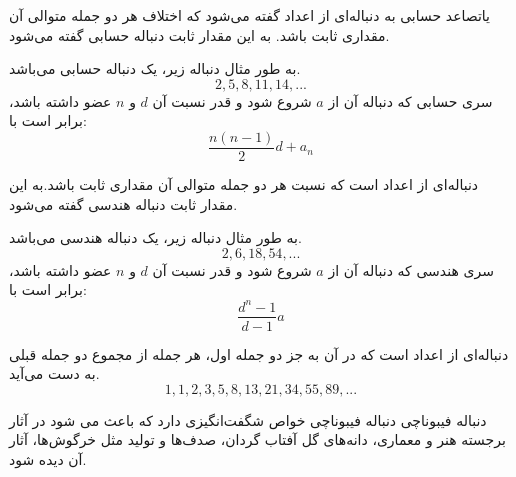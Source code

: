 \begin{definition}
    \p
    یاتصاعد حسابی به دنباله‌ای از اعداد گفته می‌شود که اختلاف هر دو جمله متوالی آن مقداری ثابت باشد. به این مقدار ثابت 
     دنباله حسابی گفته می‌شود.
\end{definition}
	\p
به طور مثال دنباله زیر، یک دنباله‌ حسابی می‌باشد.
	\p
$$2, 5, 8, 11, 14, ...$$
	\p
سری حسابی که دنباله آن از
$a$
شروع شود و قدر نسبت آن
$d$
 و
$n$
عضو داشته باشد، برابر است با:
	\p
$$\frac{n(n-1)}{2}d + a_n$$
	\p







\begin{definition}
    \p
   دنباله‌ای از اعداد است که نسبت هر دو جمله متوالی آن مقداری ثابت باشد.به این مقدار ثابت 
    دنباله هندسی گفته می‌شود.    
\end{definition}
	\p
به طور مثال دنباله زیر، یک دنباله هندسی می‌باشد.
	\p
$$2, 6, 18, 54, ...$$
	\p
	سری هندسی که دنباله آن از
$a$
شروع شود و قدر نسبت آن
$d$
 و
$n$
عضو داشته باشد، برابر است با:
	\p
$$\frac{d^n - 1}{d - 1}a$$
	\p





\begin{definition}
    \p
    دنباله‌ای از اعداد است که در آن به جز دو جمله اول، هر جمله از مجموع دو جمله قبلی به دست می‌آید.
    \p
  $$1, 1, 2, 3, 5, 8, 13, 21, 34, 55, 89, ...$$
	\p 
\end{definition}
\begin{extra}{دنباله فیبوناچی}
دنباله فیبوناچی خواص شگفت‌انگیزی دارد که باعث می شود در آثار برجسته هنر و معماری، دانه‌های گل آفتاب گردان، صدف‌ها و تولید مثل خرگوش‌ها، آثار آن دیده شود.
\end{extra}
